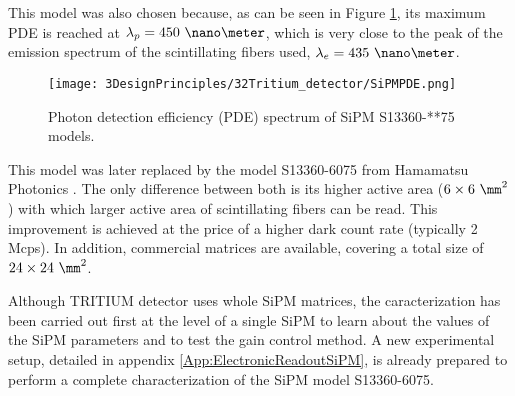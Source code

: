 This model was also chosen because, as can be seen in Figure \ref{fig:PDESiPM}, its maximum PDE is reached at $\lambda_p=450~\nano\meter$, which is very close to the peak of the emission spectrum of the scintillating fibers used, $\lambda_e=435~\nano\meter$.

\begin{figure}[htbp]
\centering
\texttt{[image: 3DesignPrinciples/32Tritium\_detector/SiPMPDE.png]}
\caption{Photon detection efficiency (PDE) spectrum of SiPM S13360-**75 models.\label{fig:PDESiPM}}
\end{figure}

This model was later replaced by the model S13360-6075 from Hamamatsu Photonics \cite{DataSheetHammamatsu_1_SiPM_75}. The only difference between both is its higher active area ($6\times6~\mm^2$) with which larger active area of scintillating fibers can be read. This improvement is achieved at the price of a higher dark count rate (typically 2 Mcps). In addition, commercial matrices are available, covering a total size of $24\times24~\mm^2$.

Although TRITIUM detector uses whole SiPM matrices, the caracterization has been carried out first at the level of a single SiPM to learn about the values of the SiPM parameters and to test the gain control method. A new experimental setup, detailed in appendix \ref{App:ElectronicReadoutSiPM}, is already  prepared to perform a complete characterization of the SiPM model S13360-6075.